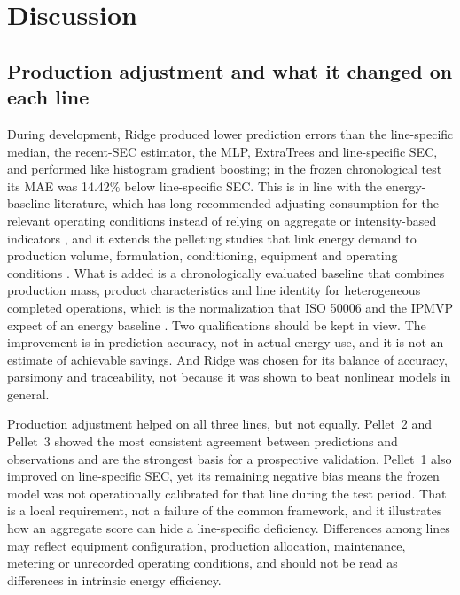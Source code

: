 \section{Discussion}\label{sec:discussion}
\subsection{Production adjustment and what it changed on each line}
During development, Ridge produced lower prediction errors than the line-specific median, the recent-SEC estimator, the MLP, ExtraTrees and line-specific SEC, and performed like histogram gradient boosting; in the frozen chronological test its MAE was 14.42\% below line-specific SEC. This is in line with the energy-baseline literature, which has long recommended adjusting consumption for the relevant operating conditions instead of relying on aggregate or intensity-based indicators \citep{kissock2008,granderson2016,gallagher2018,cosgrove2018}, and it extends the pelleting studies that link energy demand to production volume, formulation, conditioning, equipment and operating conditions \citep{skoch1981,thomas1996,thomas1997,thomas2020,bastiaansen2023}. What is added is a chronologically evaluated baseline that combines production mass, product characteristics and line identity for heterogeneous completed operations, which is the normalization that ISO 50006 and the IPMVP expect of an energy baseline \citep{iso50006,ipmvp2022}. Two qualifications should be kept in view. The improvement is in prediction accuracy, not in actual energy use, and it is not an estimate of achievable savings. And Ridge was chosen for its balance of accuracy, parsimony and traceability, not because it was shown to beat nonlinear models in general.

Production adjustment helped on all three lines, but not equally. Pellet~2 and Pellet~3 showed the most consistent agreement between predictions and observations and are the strongest basis for a prospective validation. Pellet~1 also improved on line-specific SEC, yet its remaining negative bias means the frozen model was not operationally calibrated for that line during the test period. That is a local requirement, not a failure of the common framework, and it illustrates how an aggregate score can hide a line-specific deficiency. Differences among lines may reflect equipment configuration, production allocation, maintenance, metering or unrecorded operating conditions, and should not be read as differences in intrinsic energy efficiency.

